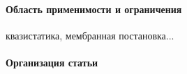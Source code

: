 
\paragraph{Область применимости и ограничения}
квазистатика, мембранная постановка...

\paragraph{Организация статьи}


